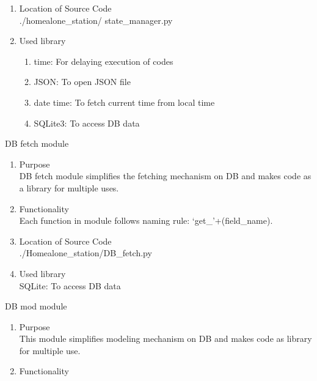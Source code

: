 \documentclass[conference]{IEEEtran}
\begin{document}
\begin{enumerate}[label=\arabic*.]
\begin{enumerate}[label=\arabic*.]
\begin{enumerate}[label=\alph*.]
        \item {\large{Location of Source Code}}\\
        ./homealone\_station/ state\_manager.py \\
        \item {\large{Used library}} 
        \begin{enumerate}[label=\roman*.]
            \item {\large{time: For delaying execution of codes }}
            \item {\large{JSON: To open JSON file }}
            \item {\large{date time: To fetch current time from local time }}
            \item {\large{SQLite3: To access DB data}}
        \end{enumerate}
    \end{enumerate}
    \begin{center}\large{DB fetch module}\end{center} 
    \begin{enumerate}[label=\alph*.]
        \item {\large{Purpose}}\\
        DB fetch module simplifies the fetching mechanism on DB and makes code as a library for multiple uses. \\
        \item {\large{Functionality}}\\
        Each function in module follows naming rule: ‘get\_’+(field\_name).
        \item {\large{Location of Source Code}}\\
        ./Homealone\_station/DB\_fetch.py \\
        \item {\large{Used library}} \\
        SQLite: To access DB data
    \end{enumerate}  
    \begin{center}\large{DB mod module}\end{center} 
    \begin{enumerate}[label=\alph*.]
        \item {\large{Purpose}}\\
        This module simplifies modeling mechanism on DB and makes code as library for multiple use. \\
        \item {\large{Functionality}}\\

\end{enumerate}
\end{enumerate}
\end{enumerate}
\end{document}
